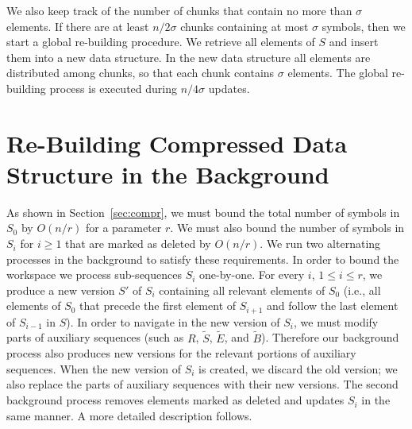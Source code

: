 \documentclass[11pt]{article}\usepackage{fullpage}
\newcommand{\tS}{{\tilde S}}
\newcommand{\tB}{{\tilde B}}
\newcommand{\tE}{{\tilde E}}
\begin{document}
We also keep track of the number of chunks that contain no more than  $\sigma$ elements. If there are at least $n/2\sigma$ chunks containing at most $\sigma$ symbols, then we start a global re-building procedure. We retrieve all elements of $S$ and insert them into a new data structure. In the new data structure all elements are distributed among chunks, so that each chunk contains $\sigma$ elements. The global re-building process is executed during $n/4\sigma$ updates. 



\section{Re-Building  Compressed Data Structure in the Background}
\label{sec:updatesbackground}
As shown in Section~\ref{sec:compr}, we must bound the total number of symbols in $S_0$ by $O(n/r)$ for a parameter $r$. 
We must also bound the number of symbols in $S_i$ for $i\ge 1$
that are marked as deleted by $O(n/r)$. 
We run two alternating processes in the background to satisfy these requirements.
 In order to bound the workspace we process sub-sequences $S_i$ one-by-one. For every $i$, $1\le i\le r$, we produce a new version $S'$ of $S_i$ containing  all relevant  elements of $S_0$ (i.e., all elements of $S_0$ that precede the first element of 
$S_{i+1}$ and follow the last element of $S_{i-1}$ in $S$). 
In order to navigate in the new version of $S_i$, we must modify parts of auxiliary sequences (such as $R$, $\tS$, $\tE$, and $\tB$). Therefore our background process also produces new versions for the relevant portions of auxiliary sequences. When the new version of $S_i$ is created, we discard the old version; we also replace the parts of auxiliary sequences with their new versions.  The second background process removes elements marked as deleted and updates $S_i$ in the same manner. A more detailed description follows. 
\end{document}

